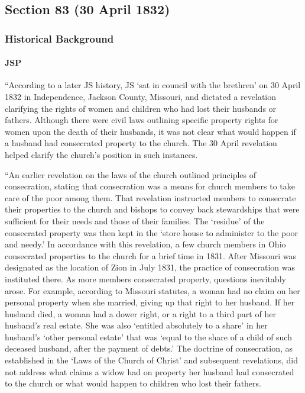 \subsection{Section 83 (30 April 1832)}
	\label{DC83}
	
	\subsubsection{Historical Background}
		\label{DC83-HB}
		
		\paragraph{JSP}
		
			``According to a later JS history, JS `sat in council with the brethren' on 30 April 1832 in Independence, Jackson County, Missouri, and dictated a revelation clarifying the rights of women and children who had lost their husbands or fathers. Although there were civil laws outlining specific property rights for women upon the death of their husbands, it was not clear what would happen if a husband had consecrated property to the church. The 30 April revelation helped clarify the church's position in such instances.

			``An earlier revelation on the laws of the church outlined principles of consecration, stating that consecration was a means for church members to take care of the poor among them. That revelation instructed members to consecrate their properties to the church and bishops to convey back stewardships that were sufficient for their needs and those of their families. The `residue' of the consecrated property was then kept in the `store house to administer to the poor and needy.' In accordance with this revelation, a few church members in Ohio consecrated properties to the church for a brief time in 1831. After Missouri was designated as the location of Zion in July 1831, the practice of consecration was instituted there. As more members consecrated property, questions inevitably arose. For example, according to Missouri statutes, a woman had no claim on her personal property when she married, giving up that right to her husband. If her husband died, a woman had a dower right, or a right to a third part of her husband's real estate. She was also `entitled absolutely to a share' in her husband's `other personal estate' that was `equal to the share of a child of such deceased husband, after the payment of debts.' The doctrine of consecration, as established in the `Laws of the Church of Christ' and subsequent revelations, did not address what claims a widow had on property her husband had consecrated to the church or what would happen to children who lost their fathers.

